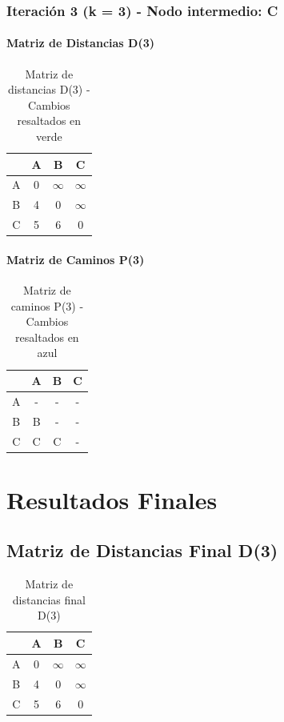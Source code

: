 \documentclass[12pt]{article}
\begin{document}
\subsubsection{Iteración 3 (k = 3) - Nodo intermedio: C}
\paragraph{Matriz de Distancias D(3)}
\begin{table}[h!]
\centering
\begin{tabular}{|c|c|c|c|}
\hline
 & A & B & C \\\hline
A & 0 & $\infty$ & $\infty$ \\\hline
B & 4 & 0 & $\infty$ \\\hline
C & 5 & 6 & 0 \\\hline
\end{tabular}
\caption{Matriz de distancias D(3) - Cambios resaltados en verde}
\end{table}

\paragraph{Matriz de Caminos P(3)}
\begin{table}[h!]
\centering
\begin{tabular}{|c|c|c|c|}
\hline
 & A & B & C \\\hline
A & - & - & - \\\hline
B & B & - & - \\\hline
C & C & C & - \\\hline
\end{tabular}
\caption{Matriz de caminos P(3) - Cambios resaltados en azul}
\end{table}

\clearpage
\section{Resultados Finales}
\subsection{Matriz de Distancias Final D(3)}
\begin{table}[h!]
\centering
\begin{tabular}{|c|c|c|c|}
\hline
 & A & B & C \\\hline
A & 0 & $\infty$ & $\infty$ \\\hline
B & 4 & 0 & $\infty$ \\\hline
C & 5 & 6 & 0 \\\hline
\end{tabular}
\caption{Matriz de distancias final D(3)}
\end{table}
\end{document}
